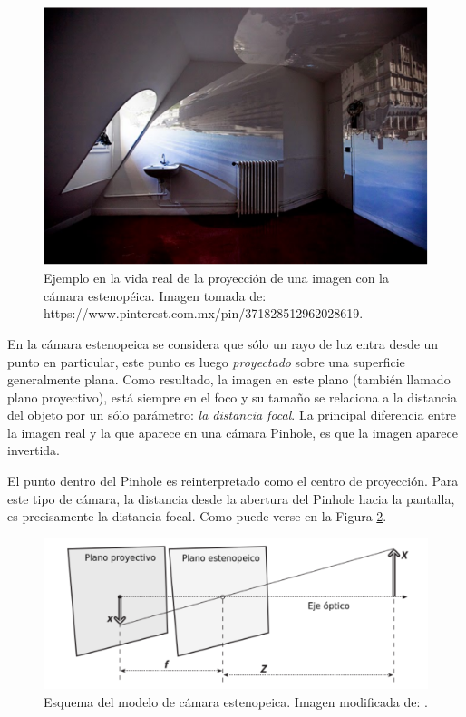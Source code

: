 \begin{figure}
	\centering		
	\includegraphics[scale=0.7]{images/pinholeCamera.pdf}
	\caption{Ejemplo en la vida real de la proyección de una imagen con la cámara estenopéica. Imagen tomada de: https://www.pinterest.com.mx/pin/371828512962028619.}		
	\label{fig:pinholeCamera}
\end{figure}

En la cámara estenopeica se considera que sólo un rayo de luz entra desde un punto en particular, este punto es luego \textit{proyectado} sobre una superficie generalmente plana. Como resultado, la imagen en este plano (también llamado plano proyectivo), está siempre en el foco y su tamaño se relaciona a la distancia del objeto por un sólo parámetro: \textit{la distancia focal}. La principal diferencia entre la imagen real y la que aparece en una cámara Pinhole, es que la imagen aparece invertida. 
	
El punto dentro del Pinhole es reinterpretado como el centro de proyección. Para este tipo de cámara, la distancia desde la abertura del Pinhole hacia la pantalla, es precisamente la distancia focal. Como puede verse en la Figura \ref{fig:pinholeScheme}.\\
	
\begin{figure}
	\centering		
	\includegraphics[scale=0.8]{images/pinholeScheme.pdf}
	\caption{Esquema del modelo de cámara estenopeica. Imagen modificada de: \cite{bradski2008learning}.}		
	\label{fig:pinholeScheme}
\end{figure}

